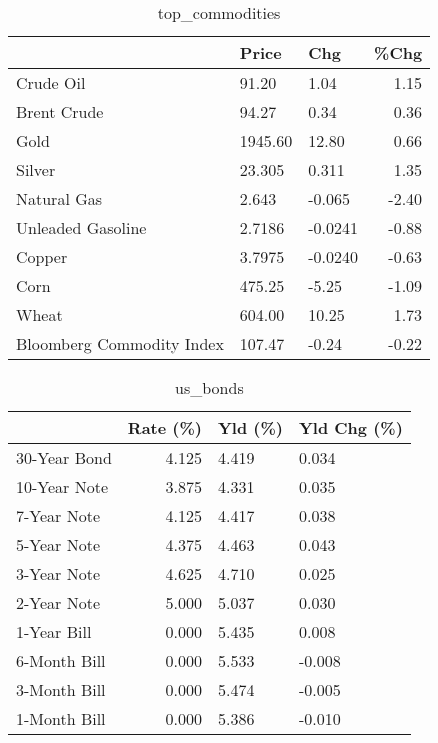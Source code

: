 \documentclass{article}%
\begin{document}
\begin{table}[htbp]%
\caption{top\_commodities}%
\centering%
\begin{adjustbox}{width=1\textwidth}%
\begin{tabular}{lllr}
\toprule
                          &   Price &     Chg &  \%Chg \\
\midrule
               Crude Oil  &   91.20 &    1.04 &  1.15 \\
             Brent Crude  &   94.27 &    0.34 &  0.36 \\
                    Gold  & 1945.60 &   12.80 &  0.66 \\
                  Silver  &  23.305 &   0.311 &  1.35 \\
             Natural Gas  &   2.643 &  -0.065 & -2.40 \\
       Unleaded Gasoline  &  2.7186 & -0.0241 & -0.88 \\
                  Copper  &  3.7975 & -0.0240 & -0.63 \\
                    Corn  &  475.25 &   -5.25 & -1.09 \\
                   Wheat  &  604.00 &   10.25 &  1.73 \\
Bloomberg Commodity Index &  107.47 &   -0.24 & -0.22 \\
\bottomrule
\end{tabular}
%
\end{adjustbox}%
\end{table}

%


\begin{table}[htbp]%
\caption{us\_bonds}%
\centering%
\begin{adjustbox}{width=1\textwidth}%
\begin{tabular}{lrll}
\toprule
             &  Rate (\%) & Yld (\%) & Yld Chg (\%) \\
\midrule
30-Year Bond &     4.125 &   4.419 &       0.034 \\
10-Year Note &     3.875 &   4.331 &       0.035 \\
 7-Year Note &     4.125 &   4.417 &       0.038 \\
 5-Year Note &     4.375 &   4.463 &       0.043 \\
 3-Year Note &     4.625 &   4.710 &       0.025 \\
 2-Year Note &     5.000 &   5.037 &       0.030 \\
 1-Year Bill &     0.000 &   5.435 &       0.008 \\
6-Month Bill &     0.000 &   5.533 &      -0.008 \\
3-Month Bill &     0.000 &   5.474 &      -0.005 \\
1-Month Bill &     0.000 &   5.386 &      -0.010 \\
\bottomrule
\end{tabular}
%
\end{adjustbox}%
\end{table}
\end{document}
